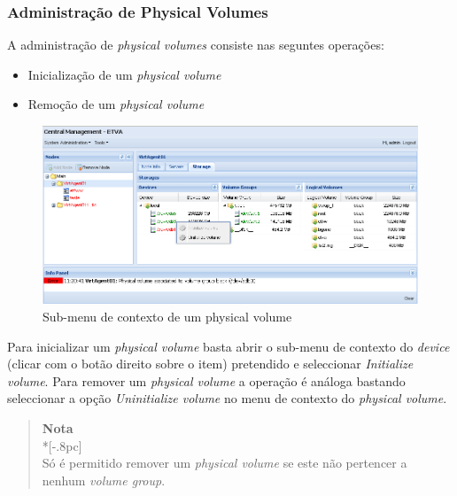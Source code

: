 
\subsubsection{Administração de Physical Volumes}
A administração de \emph{physical volumes} consiste nas seguntes operações:
\begin{itemize}
	\item Inicialização de um \emph{physical volume}
        \item Remoção de um \emph{physical volume}
\end{itemize}

\begin{figure}[H]
        \begin{center}
        \includegraphics[scale=0.5]{screenshots/node_storage_device_ctx.png}
        \caption{Sub-menu de contexto de um physical volume}
        \label{fig:storage_device_ctx}
        \end{center}
\end{figure}


Para inicializar um \emph{physical volume} basta abrir o sub-menu de contexto do \emph{device} (clicar com o botão direito sobre o item) pretendido e seleccionar \emph{Initialize volume}. Para remover um \emph{physical volume} a operação é análoga bastando seleccionar a opção \emph{Uninitialize volume} no menu de contexto do \emph{physical volume}.

\begin{quote}
	{\large \bf Nota} \\*[-.8pc]
	\underline{\hspace{6in}} \\
	Só é permitido remover um \emph{physical volume} se este não pertencer a nenhum \emph{volume group}.
\end{quote}


